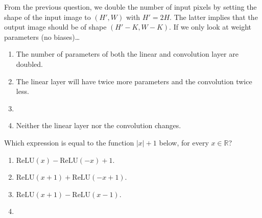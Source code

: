 \documentclass[11pt, a4paper]{exam}
\newcommand{\ReLU}{\mathrm{ReLU}}
\begin{document}
\begin{quiz}
    \item From the previous question, we double the number of input pixels by setting the shape of the input image to $(H', W)$ with $H' = 2H$. The latter implies that the output image should be of shape $(H' - K, W - K)$. If we only look at weight parameters (no biases)\ldots
    \begin{enumerate}[label=$\bigcirc$]
        \item The number of parameters of both the linear and convolution layer are doubled.
        \item The linear layer will have twice more parameters and the convolution twice less.
        \item {}
        \item Neither the linear layer nor the convolution changes.
    \end{enumerate}

    \item Which expression is equal to the function $|x| + 1$ below, for every $x \in \mathbb{R}$?
    \begin{center}
    \end{center}
    \begin{enumerate}[label=$\bigcirc$]
        \item $\ReLU(x) - \ReLU(-x) + 1$.
        \item $\ReLU(x + 1) + \ReLU(-x + 1)$.
        \item $\ReLU(x + 1) - \ReLU(x - 1)$.
        \item \correct{$\ReLU(x) + \ReLU(-x) + 1$.}
    \end{enumerate}


\end{quiz}
\end{document}
